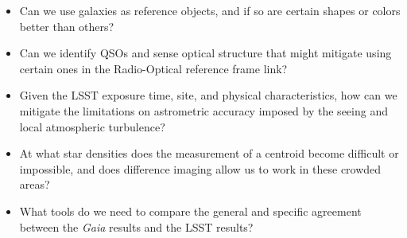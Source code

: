 \begin{itemize}
\item Can we use galaxies as reference objects, and if so are certain
shapes or colors better than others?
\item Can we identify QSOs and sense optical structure that might
mitigate using certain ones in the Radio-Optical reference frame link?
\item Given the LSST exposure time, site, and physical characteristics,
how can we mitigate the limitations on astrometric accuracy imposed
by the seeing and local atmospheric turbulence?
\item At what star densities does the measurement of a centroid become
difficult or impossible, and does difference imaging allow us to work
in these crowded areas?
\item What tools do we need to compare the general and specific agreement
between the {\it Gaia} results and the LSST results?
\end{itemize}
